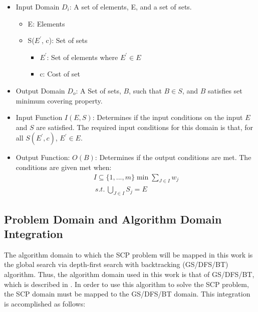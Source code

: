 \documentclass[12pt]{article}
\begin{document}
	\begin{itemize}
		\item Input Domain $D_i$: A set of elements, E, and a set of sets. 
		\begin{itemize}
			\item E: Elements
			\item S($E^\prime$, c): Set of sets
			\begin{itemize}
				\item $E^\prime$: Set of elements where $E^\prime \in E$
				\item c: Cost of set
			\end{itemize}
		\end{itemize}	
		\item Output Domain $D_o$: A Set of sets, $B$, such that $B \in S$, and $B$ satisfies set minimum covering property. 
		
		\item Input Function $I(E, S)$: Determines if the input conditions on the input $E$ and $S$ are satisfied. The required input conditions for this domain is that, for all $S(E^\prime, c)$, $E^\prime \in E$.
		\item Output Function: $O(B)$: Determines if the output conditions are met. The conditions are given met when:
		\begin{align*}
		I \subseteq \{1,...,m\} \min \sum_{J \in I} w_j \\
		\:s.t.\: \bigcup_{J \in I} S_j = E
		\end{align*}
		
	\end{itemize}
	
	\subsection{Problem Domain and Algorithm Domain Integration}
	
	The algorithm domain to which the SCP problem will be mapped in this work is the global search via depth-first search with backtracking (GS/DFS/BT) algorithm. Thus, the algorithm domain used in this work is that of GS/DFS/BT, which is described in \cite{ClassNotes686}. In order to use this algorithm to solve the SCP problem, the SCP domain must be mapped to the GS/DFS/BT domain. This integration is accomplished as follows:
	
\end{document}
